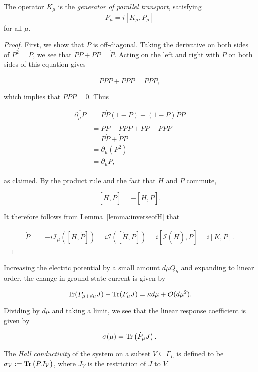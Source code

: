 \documentclass[12pt, letterpaper]{article}
\begin{document}
\begin{proposition}
The operator $K_\mu$ is the \emph{generator of parallel transport}, satisfying
\[\dot{P}_\mu = i[K_\mu,P_\mu]\]
for all $\mu$.
\label{prop:generatorparalleltransport}
\end{proposition}
\begin{proof}
First, we show that $\dot{P}$ is off-diagonal. Taking the derivative on both sides of $P^2=P$, we see that $\dot{P} P + P \dot{P} = \dot{P}$. Acting on the left and right with $P$ on both sides of this equation gives 

\[P\dot{P}P + P\dot{P}P = P\dot{P}P,\]

which implies that $P\dot{P}P = 0$. Thus 

\[\begin{aligned}
\overline{\partial_\mu P} &= P\dot{P}(1-P) + (1-P)\dot{P}P\\
&= P\dot{P} - P\dot{P}P + \dot{P}P - P\dot{P}P\\
&= P\dot{P} + \dot{P}P\\
&= \partial_\mu (P^2)\\
&= \partial_\mu P,
\end{aligned}\]

as claimed. By the product rule and the fact that $H$ and $P$ commute, 

\[ [\dot{H}, P] = -[H, \dot{P}]. \]

It therefore follows from Lemma~\ref{lemma:inverseofH} that 

\[\begin{aligned}
\dot{P} &= -i \mathcal{I}_\mu([H, \dot{P}]) = i\mathcal{I}([\dot{H}, P]) = i[\mathcal{I}(\dot{H}), P] = i[K, P].
\end{aligned}\]
\end{proof}

Increasing the electric potential by a small amount $d\mu Q_h$ and expanding to linear order, the change in ground state current is given by

\[\text{Tr}(P_{\mu+d\mu}J) - \text{Tr}(P_\mu J) = \kappa d\mu + \mathcal{O}(d\mu^2).\]

Dividing by $d\mu$ and taking a limit, we see that the linear response coefficient is given by

\[\sigma(\mu) = \text{Tr}\left(\dot{P}_\mu J\right).\]

The \emph{Hall conductivity} of the system on a subset $V \subseteq \Gamma_L$ is defined to be $\sigma_V := \text{Tr}\left(\dot{P} J_V\right)$, where $J_V$ is the restriction of $J$ to $V$. 
\end{document}
